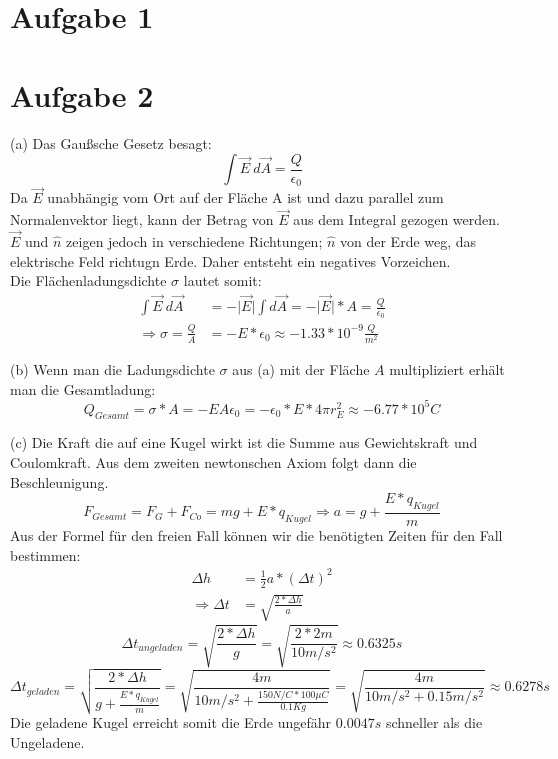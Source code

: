 \documentclass[a4paper]{article}
\newcommand{\epszero}{\epsilon_0}
\begin{document}
\thispagestyle{fancy}

\section*{Aufgabe 1}
\section*{Aufgabe 2}
\par{(a)} 
Das Gaußsche Gesetz besagt:
\[ \int \vec{E} \  d\vec{A} = \frac{Q}{\epsilon_0} \]
Da $\vec{E}$ unabhängig vom Ort auf der Fläche A ist und dazu parallel zum Normalenvektor liegt, kann der Betrag von $\vec{E}$ aus dem Integral gezogen werden.\\
$\vec{E}$ und $\hat{n}$ zeigen jedoch in verschiedene Richtungen; $\hat{n}$ von der Erde weg, das elektrische Feld richtugn Erde. Daher entsteht ein negatives Vorzeichen.\\
Die Flächenladungsdichte $\sigma$ lautet somit:
\begin{align*}
	\int \vec E \ d\vec A &= -\vert \vec E \vert \int d\vec A = -\vert \vec E \vert * A = \frac{Q}{\epszero} \\
	\Rightarrow \sigma = \frac{Q}{A} &= -E*\epszero
	\approx -1.33 * 10^{-9} \frac{Q}{m^2}
\end{align*}

\par{(b)}
Wenn man die Ladungsdichte $\sigma$ aus (a) mit der Fläche $A$ multipliziert erhält man die Gesamtladung:
\[
	Q_{Gesamt} = \sigma * A = -EA\epszero = -\epszero * E * 4\pi r_E^2 
	\approx -6.77 * 10^5 C
\]

\par{(c)}
Die Kraft die auf eine Kugel wirkt ist die Summe aus Gewichtskraft und Coulomkraft. Aus dem zweiten newtonschen Axiom folgt dann die Beschleunigung.
\[
	F_{Gesamt} = F_G + F_{Co} = mg + E*q_{Kugel} \Rightarrow a = g + \frac{E*q_{Kugel}}{m} 
\]
Aus der Formel für den freien Fall können wir die benötigten Zeiten für den Fall bestimmen:
\begin{align*}
	\Delta h &= \frac{1}{2} a*(\Delta t)^2 \\
	\Rightarrow \Delta t &= \sqrt{\frac{2*\Delta h}{a}}
\end{align*}
\[ 
	\Delta t_{ungeladen} = \sqrt{\frac{2*\Delta h}{g}} = \sqrt{\frac{2*2m}{10m/s^2}} \approx 0.6325s
\]
\[
	\Delta t_{geladen} = \sqrt{\frac{2*\Delta h}{g + \frac{E*q_{Kugel}}{m} }}
	= \sqrt{\frac{4m}{10m/s^2 + \frac{150N/C * 100 \mu C}{0.1 Kg} }}
	= \sqrt{\frac{4m}{10m/s^2 + 0.15 m/s^2}} \approx 0.6278s
\]
Die geladene Kugel erreicht somit die Erde ungefähr $0.0047s$ schneller als die Ungeladene.
\end{document}
